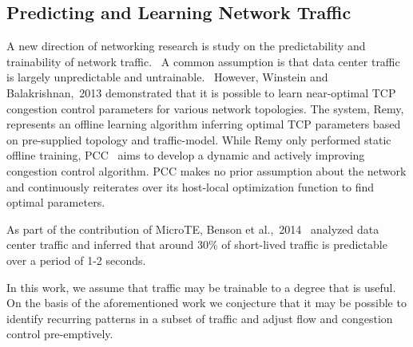 \subsection{Predicting and Learning Network Traffic}
A new direction of networking research is study on the predictability and 
trainability of network traffic.~\cite{throwdown, learning_tcp}
A common assumption is that data center traffic is largely unpredictable and 
untrainable.~\cite{fb_dc}
However, Winstein and Balakrishnan,~2013\cite{remy} demonstrated that it is 
possible to learn near-optimal TCP congestion control parameters for various 
network topologies. The system, Remy, represents an offline learning algorithm 
inferring optimal TCP parameters based on pre-supplied topology and 
traffic-model.
While Remy only performed static offline training, PCC~\cite{pcc,throwdown} 
aims to develop a dynamic and actively improving congestion control algorithm. 
PCC makes no prior assumption about the network and continuously reiterates over
its host-local optimization function to find optimal parameters.

As part of the contribution of MicroTE, Benson et 
al.,~2014~\cite{microte} analyzed data center traffic and 
inferred that around 30\% of short-lived traffic is predictable over a period 
of 1-2 seconds.

In this work, we assume that traffic may be trainable to a degree that is 
useful. On the basis of the aforementioned work we conjecture that it may be 
possible to identify recurring patterns in a subset of traffic and adjust flow 
and congestion control pre-emptively.